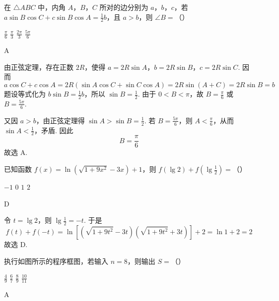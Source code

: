 \begin{problem}
在 \(\triangle ABC\) 中，内角 \(A\)，\(B\)，\(C\) 所对的边分别为 \(a\)，\(b\)，\(c\)，若 \(a \sin B \cos C + c \sin B \cos A = \frac{1}{2} b\)，且 \(a > b\)，则 \(\angle B =\)（\quad）

\choices
    {\(\frac{\pi}{6}\)}
    {\(\frac{\pi}{3}\)}
    {\(\frac{2\pi}{3}\)}
    {\(\frac{5\pi}{6}\)}
\end{problem}

\begin{answer}
A
\end{answer}

\begin{solution}
由正弦定理，存在正数 \(2R\)，使得
\(a=2R\sin A\)，\(b=2R\sin B\)，\(c=2R\sin C\). 因而
\[
a\cos C+c\cos A
 =2R(\sin A\cos C+\sin C\cos A)
 =2R\sin(A+C)=2R\sin B=b
\]
题设等式化为 \(b\sin B=\frac12b\)，所以
\(\sin B=\frac12\). 由于 \(0<B<\pi\)，故
\(B=\frac\pi6\) 或 \(B=\frac{5\pi}6\).

又因 \(a>b\)，由正弦定理得 \(\sin A>\sin B=\frac12\). 若
\(B=\frac{5\pi}6\)，则 \(A<\frac\pi6\)，从而
\(\sin A<\frac12\)，矛盾. 因此
\[
B=\frac\pi6
\]
故选 A.
\end{solution}

\begin{problem}
已知函数 \( f(x) = \ln (\sqrt{1 + 9x^2} - 3x) + 1 \)，则 \( f(\lg 2) + f\left(\lg \frac{1}{2}\right) = \)（\quad）

\choices
    {\(-1\)}
    {\(0\)}
    {\(1\)}
    {\(2\)}
\end{problem}

\begin{answer}
D
\end{answer}

\begin{solution}
令 \(t=\lg2\)，则 \(\lg\frac12=-t\). 于是
\[
f(t)+f(-t)=\ln\left[(\sqrt{1+9t^2}-3t)(\sqrt{1+9t^2}+3t)\right]+2=\ln1+2=2
\]
故选 D.
\end{solution}

\begin{problem}
执行如图所示的程序框图，若输入 \(n = 8\)，则输出 \(S =\)（\quad）


\choices
    {\(\frac{4}{9}\)}
    {\(\frac{6}{7}\)}
    {\(\frac{8}{9}\)}
    {\(\frac{10}{11}\)}
\end{problem}

\begin{answer}
A
\end{answer}

